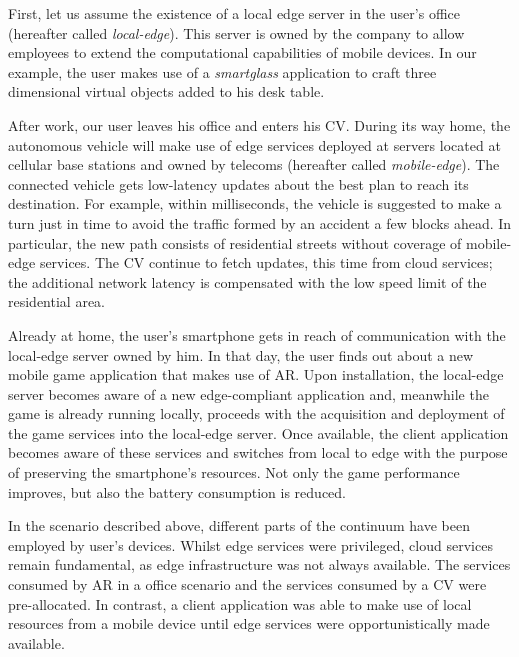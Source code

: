 First, let us assume the existence of a local edge server in the user's office (hereafter called \textit{local-edge}). This server is owned by the company to allow employees to extend the computational capabilities of mobile devices. In our example, the user makes use of a \textit{smartglass} application to craft three dimensional virtual objects added to his desk table.

After work, our user leaves his office and enters his CV. During its way home, the autonomous vehicle will make use of edge services deployed at servers located at cellular base stations and owned by telecoms (hereafter called \textit{mobile-edge}). The connected vehicle gets low-latency updates about the best plan to reach its destination. For example, within milliseconds, the vehicle is suggested to make a turn just in time to avoid the traffic formed by an accident a few blocks ahead. In particular, the new path consists of residential streets without coverage of mobile-edge services. The CV continue to fetch updates, this time from cloud services; the additional network latency is compensated with the low speed limit of the residential area.

Already at home, the user's smartphone gets in reach of communication with the local-edge server owned by him. In that day, the user finds out about a new mobile game application that makes use of AR. Upon installation, the local-edge server becomes aware of a new edge-compliant application and, meanwhile the game is already running locally, proceeds with the acquisition and deployment of the game services into the local-edge server. Once available, the client application becomes aware of these services and switches from local to edge with the purpose of preserving the smartphone's resources. Not only the game performance improves, but also the battery consumption is reduced.  

In the scenario described above, different parts of the continuum have been employed by user's devices. Whilst edge services were privileged, cloud services remain fundamental, as edge infrastructure was not always available. The services consumed by AR in a office scenario and the services consumed by a CV were pre-allocated. In contrast, a client application was able to make use of local resources from a mobile device until edge services were opportunistically made available. 

